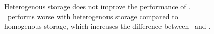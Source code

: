 {\begin{figure}[t]
\begin{center}
\end{center}
\caption{Heterogenous storage does not improve the performance of \optrp. \invlru\ performs worse with heterogenous storage compared to homogenous storage, which increases the difference between   \optrpfuture\ and \invlru.}
\label{fig:hetpop}
\end{figure}
}


